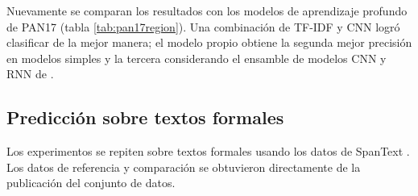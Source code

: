 Nuevamente se comparan los resultados con los modelos de aprendizaje profundo de PAN17 (tabla \ref{tab:pan17region}). Una combinación de TF-IDF y CNN \parencite{schaetti2017author} logró clasificar de la mejor manera; el modelo propio obtiene la segunda mejor precisión en modelos simples y la tercera considerando el ensamble de modelos CNN y RNN de \textcite{miura2017author}.

\subsection{Predicción sobre textos formales}

Los experimentos se repiten sobre textos formales usando los datos de SpanText \parencite{villegas:2014:CACIC}. Los datos de referencia y comparación se obtuvieron directamente de la publicación del conjunto de datos.

